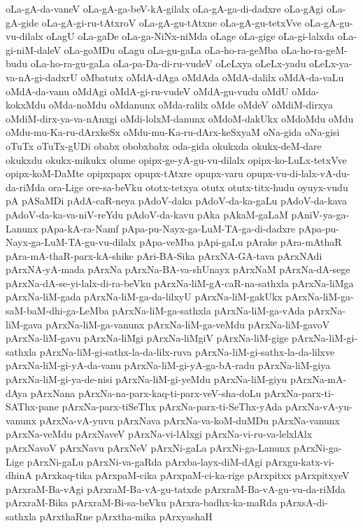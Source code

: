 {oLa-gA-da-vaneV
oLa-gA-ga-beV-kA-gilalx
oLa-gA-ga-di-dadxre
oLa-gAgi
oLa-gA-gide
oLa-gA-gi-ru-tAtxroV
oLa-gA-gu-tAtxne
oLa-gA-gu-tetxVve
oLa-gA-gu-vu-dilalx
oLagU
oLa-gaDe
oLa-ga-NiNx-niMda
oLage
oLa-gige
oLa-gi-lalxda
oLa-gi-niM-daleV
oLa-goMDu
oLagu
oLa-gu-gaLa
oLa-ho-ra-geMba
oLa-ho-ra-geM-budu
oLa-ho-ra-gu-gaLa
oLa-pa-Da-di-ru-vudeV
oLeLxya
oLeLx-yadu
oLeLx-ya-va-nA-gi-dadxrU
oMbatutx
oMdA-dAga
oMdAda
oMdA-dalilx
oMdA-da-vaLu
oMdA-da-vanu
oMdAgi
oMdA-gi-ru-vudeV
oMdA-gu-vudu
oMdU
oMda-kokxMdu
oMda-noMdu
oMdanunx
oMda-ralilx
oMde
oMdeV
oMdiM-dirxya
oMdiM-dirx-ya-va-nAnxgi
oMdi-lolxM-danunx
oMdoM-dakUkx
oMdoMdu
oMdu
oMdu-mu-Ka-ru-dArxkeSx
oMdu-mu-Ka-ru-dArx-keSxyaM
oNa-gida
oNa-gisi
oTuTx
oTuTx-gUDi
obabx
obobxbabx
oda-gida
okukxda
okukx-deM-dare
okukxdu
okukx-mikukx
olume
opipx-ge-yA-gu-vu-dilalx
opipx-ko-LuLx-tetxVve
opipx-koM-DaMte
opipxpapx
opupx-tAtxre
opupx-varu
opupx-vu-di-lalx-vA-du-da-riMda
ora-Lige
ore-sa-beVku
ototx-tetxya
otutx
otutx-titx-hudu
oyuyx-vudu
pA
pASaMDi
pAdA-caR-neya
pAdoV-daka
pAdoV-da-ka-gaLu
pAdoV-da-kava
pAdoV-da-ka-va-niV-reYdu
pAdoV-da-kavu
pAka
pAkaM-gaLaM
pAniV-ya-ga-Lanunx
pApa-kA-ra-Namf
pApa-pu-Nayx-ga-LuM-TA-ga-di-dadxre
pApa-pu-Nayx-ga-LuM-TA-gu-vu-dilalx
pApa-veMba
pApi-gaLu
pArake
pAra-mAthaR
pAra-mA-thaR-parx-kA-shike
pAri-BA-Sika
pArxNA-GA-tava
pArxNAdi
pArxNA-yA-mada
pArxNa
pArxNa-BA-va-shUnayx
pArxNaM
pArxNa-dA-sege
pArxNa-dA-se-yi-lalx-di-ra-beVku
pArxNa-liM-gA-caR-na-sathxla
pArxNa-liMga
pArxNa-liM-gada
pArxNa-liM-ga-da-lilxyU
pArxNa-liM-gakUkx
pArxNa-liM-ga-saM-baM-dhi-ga-LeMba
pArxNa-liM-ga-sathxla
pArxNa-liM-ga-vAda
pArxNa-liM-gava
pArxNa-liM-ga-vanunx
pArxNa-liM-ga-veMdu
pArxNa-liM-gavoV
pArxNa-liM-gavu
pArxNa-liMgi
pArxNa-liMgiV
pArxNa-liM-gige
pArxNa-liM-gi-sathxla
pArxNa-liM-gi-sathx-la-da-lilx-ruva
pArxNa-liM-gi-sathx-la-da-lilxve
pArxNa-liM-gi-yA-da-vanu
pArxNa-liM-gi-yA-ga-bA-radu
pArxNa-liM-giya
pArxNa-liM-gi-ya-de-nisi
pArxNa-liM-gi-yeMdu
pArxNa-liM-giyu
pArxNa-mA-dAya
pArxNana
pArxNa-na-parx-kaq-ti-parx-veV-sha-doLu
pArxNa-parx-ti-SAThx-pane
pArxNa-parx-tiSeThx
pArxNa-parx-ti-SeThx-yAda
pArxNa-vA-yu-vanunx
pArxNa-vA-yuvu
pArxNava
pArxNa-va-koM-duMDu
pArxNa-vanunx
pArxNa-veMdu
pArxNaveV
pArxNa-vi-lAlxgi
pArxNa-vi-ru-va-lelxlAlx
pArxNavoV
pArxNavu
pArxNeV
pArxNi-gaLa
pArxNi-ga-Lanunx
pArxNi-ga-Lige
pArxNi-gaLu
pArxNi-va-gaRda
pArxba-layx-diM-dAgi
pArxgu-katx-vi-dhinA
pArxkaq-tika
pArxpaM-cika
pArxpaM-ci-ka-rige
pArxpitxx
pArxpitxyeV
pArxraM-Ba-vAgi
pArxraM-Ba-vA-gu-tatxde
pArxraM-Ba-vA-gu-vu-da-riMda
pArxraM-Bika
pArxraM-Bi-sa-beVku
pArxra-badhx-ka-maRda
pArxsA-di-sathxla
pArxthaRne
pArxtha-mika
pArxyashaH
}
